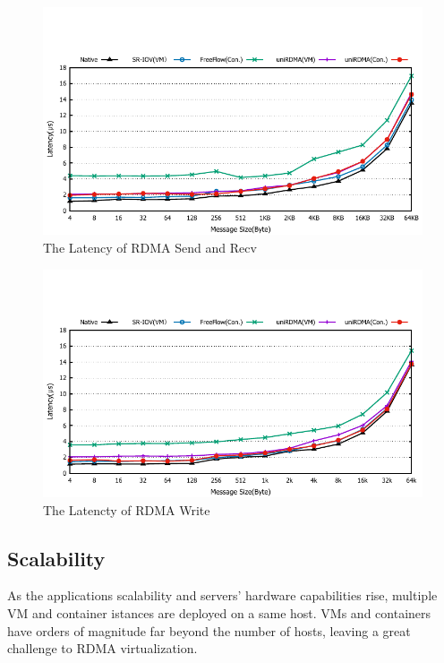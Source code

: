 \begin{figure}[!ht]
	\centering
	\includegraphics[width=1.0\linewidth]{images/send-lat.pdf}
	\caption{The Latency of RDMA Send and Recv}
	\label{fig:send-lat}
\end{figure}

\begin{figure}[!ht]
	\centering
	\includegraphics[width=1.0\linewidth]{images/write-lat.pdf}
	\caption{The Latencty of RDMA Write}
	\label{fig:write-lat}
\end{figure}

\subsection{Scalability}

As the applications scalability and servers' hardware capabilities rise, multiple VM and container istances are deployed on a same host. VMs and containers have orders of magnitude far beyond the number of hosts, leaving a great challenge to RDMA virtualization. 

